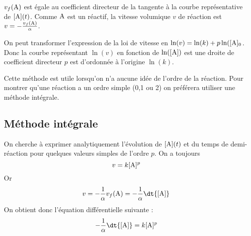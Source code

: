 \documentclass{cours}
\begin{document}
$v_f(\ce{A})$ est égale au coefficient directeur de la tangente à la courbe représentative de $[\ce{A}](t)$. Comme $\ce{A}$  est un réactif, la vitesse volumique $v$ de réaction est $v = -\frac{v_f(\ce{A})}{\alpha}$. 
\begin{center}
\end{center}

On peut transformer l'expression de la loi de vitesse en $\ln(v) = \ln(k) + p\ln([\ce{A}]_0$. Donc la courbe représentant $\ln(v)$ en fonction de $\ln([\ce{A}])$ est une droite de coefficient directeur $p$ est d'ordonnée à l'origine $\ln(k)$.   

\begin{center}
\end{center}

Cette méthode est utile lorsqu'on n'a aucune idée de l'ordre de la réaction. Pour montrer qu'une réaction a un ordre simple (0,1 ou 2) on préférera utiliser une méthode intégrale.

\subsection{Méthode intégrale}%
\label{sub:methode_integrale}
On cherche à exprimer analytiquement l'évolution de $[\ce{A}](t)$ et du temps de demi-réaction pour quelques valeurs simples de l'ordre $p$. On a toujours 
\[
v = k [\ce{A}]^p
\]
Or \[v = -\frac{1}{\alpha}v_f(\ce{A}) = -\frac{1}{\alpha}\dt{[\ce{A}]}\]
On obtient donc l'équation différentielle suivante :
\[-\frac{1}{\alpha}\dt{[\ce{A}]} = k[\ce{A}]^p\]
\end{document}
